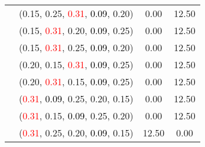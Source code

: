 \documentclass[10pt,a4paper]{report}
\begin{document}
\begin{center}
\begin{longtable}{clcc}
			&(0.15, 0.25, \textcolor{red}{0.31}, \textcolor{black}{0.09}, 0.20)&0.00&12.50\\
			&(0.15, \textcolor{red}{0.31}, 0.20, \textcolor{black}{0.09}, 0.25)&0.00&12.50\\
			&(0.15, \textcolor{red}{0.31}, 0.25, \textcolor{black}{0.09}, 0.20)&0.00&12.50\\
			&(0.20, 0.15, \textcolor{red}{0.31}, \textcolor{black}{0.09}, 0.25)&0.00&12.50\\
			&(0.20, \textcolor{red}{0.31}, 0.15, \textcolor{black}{0.09}, 0.25)&0.00&12.50\\
			&(\textcolor{red}{0.31}, \textcolor{black}{0.09}, 0.25, 0.20, 0.15)&0.00&12.50\\
			&(\textcolor{red}{0.31}, 0.15, \textcolor{black}{0.09}, 0.25, 0.20)&0.00&12.50\\
			&(\textcolor{red}{0.31}, 0.25, 0.20, \textcolor{black}{0.09}, 0.15)&12.50&0.00\\
		\bottomrule
	\end{longtable}
\end{center}
\end{document}
